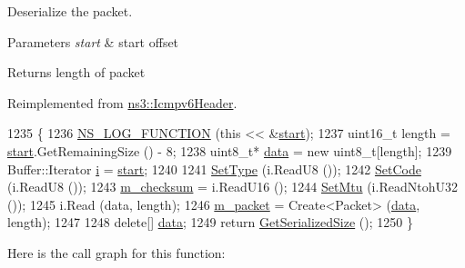 Deserialize the packet. 


\begin{DoxyParams}{Parameters}
{\em start} & start offset \\
\hline
\end{DoxyParams}
\begin{DoxyReturn}{Returns}
length of packet 
\end{DoxyReturn}


Reimplemented from \hyperlink{classns3_1_1Icmpv6Header_a7507f363f31e23fb11ceb21aec6be469}{ns3\+::\+Icmpv6\+Header}.


\begin{DoxyCode}
1235 \{
1236   \hyperlink{log-macros-disabled_8h_a90b90d5bad1f39cb1b64923ea94c0761}{NS\_LOG\_FUNCTION} (\textcolor{keyword}{this} << &\hyperlink{namespacevisualizer_1_1core_a2a35e5d8a34af358b508dac8635754e0}{start});
1237   uint16\_t length = \hyperlink{namespacevisualizer_1_1core_a2a35e5d8a34af358b508dac8635754e0}{start}.GetRemainingSize () - 8;
1238   uint8\_t* \hyperlink{topology-example-sim_8cc_a26c65296e316af77b787dc77469bb2a4}{data} = \textcolor{keyword}{new} uint8\_t[length];
1239   Buffer::Iterator \hyperlink{bernuolliDistribution_8m_a6f6ccfcf58b31cb6412107d9d5281426}{i} = \hyperlink{namespacevisualizer_1_1core_a2a35e5d8a34af358b508dac8635754e0}{start};
1240 
1241   \hyperlink{classns3_1_1Icmpv6Header_acd72c655fc99e3b4399501bd14149c52}{SetType} (i.ReadU8 ());
1242   \hyperlink{classns3_1_1Icmpv6Header_aa08a37a07a6a11973b2603e69d6e859c}{SetCode} (i.ReadU8 ());
1243   \hyperlink{classns3_1_1Icmpv6Header_a6fe65b5998d91492bf6c1e13c8a0f29c}{m\_checksum} = i.ReadU16 ();
1244   \hyperlink{classns3_1_1Icmpv6TooBig_a1f122834e53dbf5b9e3f16e85621a9f8}{SetMtu} (i.ReadNtohU32 ());
1245   i.Read (data, length);
1246   \hyperlink{classns3_1_1Icmpv6TooBig_a51a43fcfb069dd9610f9f1de5193849c}{m\_packet} = Create<Packet> (\hyperlink{topology-example-sim_8cc_a26c65296e316af77b787dc77469bb2a4}{data}, length);
1247 
1248   \textcolor{keyword}{delete}[] \hyperlink{topology-example-sim_8cc_a26c65296e316af77b787dc77469bb2a4}{data};
1249   \textcolor{keywordflow}{return} \hyperlink{classns3_1_1Icmpv6TooBig_a4cfe017439e4d25c56d503a276b1efa0}{GetSerializedSize} ();
1250 \}
\end{DoxyCode}


Here is the call graph for this function\+:


